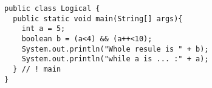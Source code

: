 \documentclass[
  11pt, %
  xcolor=dvipsnames
]{beamer}
\begin{document}
\begin{frame}[fragile]


	\begin{columns}[c]
		\begin{column}{0.9\textwidth}

			\begin{lstlisting}[style=Java]
public class Logical {
  public static void main(String[] args){
    int a = 5;
    boolean b = (a<4) && (a++<10);
    System.out.println("Whole resule is " + b);
    System.out.println("while a is ... :" + a);
  } // ! main
}
      \end{lstlisting}

		\end{column}
	\end{columns}

\end{frame}
\end{document}
